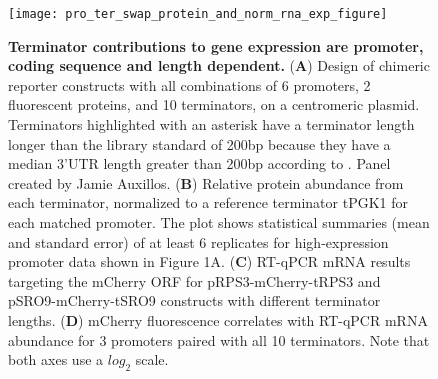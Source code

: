 \documentclass[../main.tex]{subfiles}
\begin{document}
\begin{figure}[p]

{\centering \texttt{[image: pro\_ter\_swap\_protein\_and\_norm\_rna\_exp\_figure]} 

}

\caption[Terminator contributions to gene expression are promoter, coding sequence and length dependent.]{\textbf{Terminator contributions to gene expression are promoter, coding sequence and length dependent.} (\textbf{A}) Design of chimeric reporter constructs with all combinations of 6 promoters, 2 fluorescent proteins, and 10 terminators, on a centromeric plasmid. Terminators highlighted with an asterisk have a terminator length longer than the library standard of 200bp because they have a median 3'UTR length greater than 200bp according to \parencite{Pelechano2013}. Panel created by Jamie Auxillos.  (\textbf{B}) Relative protein abundance from each terminator, normalized to a reference terminator tPGK1 for each matched promoter. The plot shows statistical summaries (mean and standard error) of at least 6 replicates for high-expression promoter data shown in Figure 1A. (\textbf{C}) RT-qPCR mRNA results targeting the mCherry ORF for pRPS3-mCherry-tRPS3 and pSRO9-mCherry-tSRO9 constructs with different terminator lengths. (\textbf{D}) mCherry fluorescence correlates with RT-qPCR mRNA abundance for 3 promoters paired with all 10 terminators. Note that both axes use a \(log_2\) scale.}\label{fig:pro-ter-platereader-mCherry-mTurq-norm}
\end{figure}
\end{document}
